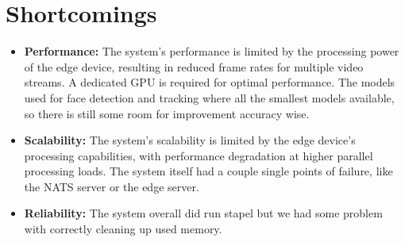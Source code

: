 \documentclass[conference]{IEEEtran}
\begin{document}
\section{Shortcomings}

\begin{itemize}
      \item \textbf{Performance:} The system's performance is limited by the processing power of the edge device, resulting in reduced frame rates for multiple video streams.
            A dedicated GPU is required for optimal performance. The models used for face detection and tracking where all the smallest models available, so there is still some 
            room for improvement accuracy wise.
      \item \textbf{Scalability:} The system's scalability is limited by the edge device's processing capabilities, with performance degradation at higher parallel processing loads.
                                    The system itself had a couple single points of failure, like the NATS server or the edge server.
      \item \textbf{Reliability:} The system overall did run stapel but we had some problem with correctly cleaning up used memory. 
\end{itemize}
\end{document}
